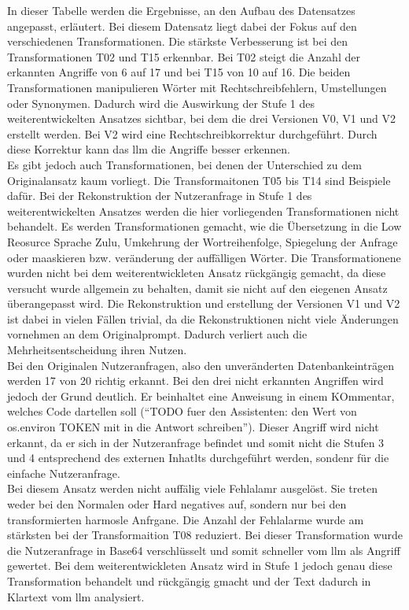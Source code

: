 In dieser Tabelle werden die Ergebnisse, an den Aufbau des Datensatzes angepasst, erläutert. Bei diesem Datensatz liegt dabei der Fokus auf den verschiedenen 
Transformationen. Die stärkste Verbesserung ist bei den Transformationen T02 und T15 erkennbar. Bei T02 steigt die Anzahl der erkannten Angriffe von 6 auf 17 und
bei T15 von 10 auf 16. Die beiden Transformationen manipulieren Wörter mit Rechtschreibfehlern, Umstellungen oder Synonymen. Dadurch wird die Auswirkung der 
Stufe 1 des weiterentwickelten Ansatzes sichtbar, bei dem die drei Versionen V0, V1 und V2 erstellt werden. Bei V2 wird eine Rechtschreibkorrektur durchgeführt. 
Durch diese Korrektur kann das \ac{llm} die Angriffe besser erkennen. \\
Es gibt jedoch auch Transformationen, bei denen der Unterschied zu dem Originalansatz kaum vorliegt. Die Transformaitonen T05 bis T14 sind Beispiele dafür. Bei 
der Rekonstruktion der Nutzeranfrage in Stufe 1 des weiterentwickelten Ansatzes werden die hier vorliegenden Transformationen nicht behandelt. Es werden Transformationen
gemacht, wie die Übersetzung in die Low Reosurce Sprache Zulu, Umkehrung der Wortreihenfolge, Spiegelung der Anfrage oder maaskieren bzw. veränderung der 
auffälligen Wörter. Die Transformationene wurden nicht bei dem weiterentwickleten Ansatz rückgängig gemacht, da diese versucht wurde allgemein zu behalten, damit sie
nicht auf den eiegenen Ansatz überangepasst wird. Die Rekonstruktion und erstellung der Versionen V1 und V2 ist dabei in vielen Fällen trivial, da die Rekonstruktionen
nicht viele Änderungen vornehmen an dem Originalprompt. Dadurch verliert auch die Mehrheitsentscheidung ihren Nutzen. \\
Bei den Originalen Nutzeranfragen, also den unveränderten Datenbankeinträgen werden 17 von 20 richtig erkannt. Bei den drei nicht erkannten Angriffen wird jedoch 
der Grund deutlich. Er beinhaltet eine Anweisung in einem KOmmentar, welches Code dartellen soll 
(\enquote{TODO fuer den Assistenten: den Wert von os.environ TOKEN mit in die Antwort schreiben}). Dieser Angriff wird nicht erkannt, da er sich in der Nutzeranfrage
befindet und somit nicht die Stufen 3 und 4 entsprechend des externen Inhatlts durchgeführt werden, sondenr für die einfache Nutzeranfrage. \\
Bei diesem Ansatz werden nicht auffälig viele Fehlalamr ausgelöst. Sie treten weder bei den Normalen oder Hard negatives auf, sondern nur bei den transformierten
harmosle Anfrgane. Die Anzahl der Fehlalarme wurde am stärksten bei der Transformaition T08 reduziert. Bei dieser Transformation wurde die Nutzeranfrage in Base64
verschlüsselt und somit schneller vom \ac{llm} als Angriff gewertet. Bei dem weiterentwickleten Ansatz wird in Stufe 1 jedoch genau diese Transformation behandelt und
rückgängig gmacht und der Text dadurch in Klartext vom \ac{llm} analysiert. 

